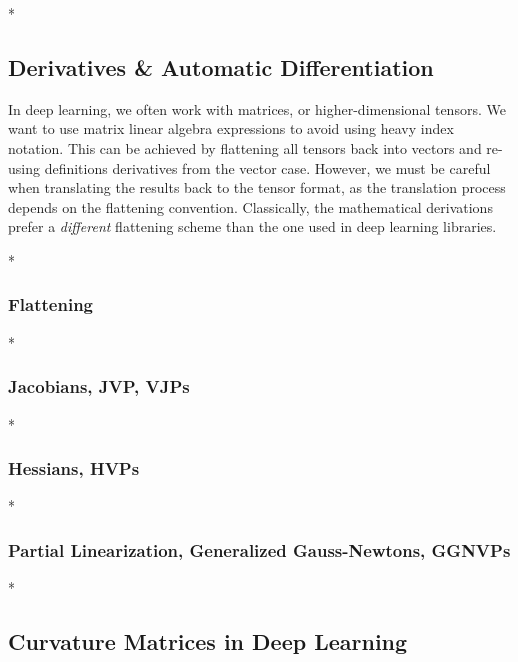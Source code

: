\blindtext

\switchcolumn[1]

\switchcolumn[0]* %

\blindtext

\subsection{Derivatives \& Automatic Differentiation}

\begin{caveat}
  In deep learning, we often work with matrices, or higher-dimensional tensors.
  We want to use matrix linear algebra expressions to avoid using heavy index notation.
  This can be achieved by flattening all tensors back into vectors and re-using definitions derivatives from the vector case.
  However, we must be careful when translating the results back to the tensor format, as the translation process depends on the flattening convention.
  Classically, the mathematical derivations prefer a \emph{different} flattening scheme than the one used in deep learning libraries.
\end{caveat}

\switchcolumn[0]*
\subsubsection{Flattening}


\switchcolumn[0]*
\subsubsection{Jacobians, JVP, VJPs}


\switchcolumn[0]*
\subsubsection{Hessians, HVPs}


\switchcolumn[0]*
\subsubsection{Partial Linearization, Generalized Gauss-Newtons, GGNVPs}


\switchcolumn[0]*
\subsection{Curvature Matrices in Deep Learning}
